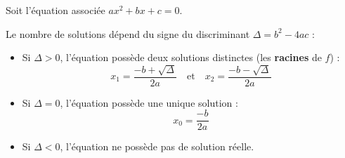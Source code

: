 \begin{prop}
	Soit l'équation associée $ax^2 + bx + c = 0$.

	Le nombre de solutions dépend du signe du discriminant $\Delta = b^2 - 4ac$ :
	\begin{itemize}
		\item Si $\Delta > 0$, l'équation possède deux solutions distinctes (les \textbf{racines} de $f$) :
		      \[
			      x_1 = \dfrac{-b + \sqrt{\Delta}}{2a} \quad \text{et} \quad x_2 = \dfrac{-b - \sqrt{\Delta}}{2a}
		      \]

		\item Si $\Delta = 0$, l'équation possède une unique solution :
		      \[
			      x_0 = \dfrac{-b}{2a}
		      \]

		\item Si $\Delta < 0$, l'équation ne possède pas de solution réelle.
	\end{itemize}
\end{prop}

